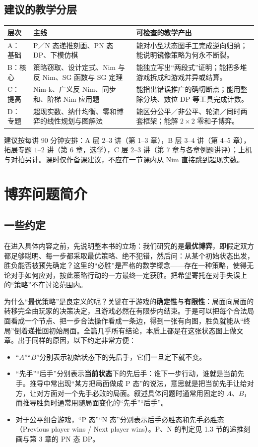 \documentclass[UTF8,a4paper,11pt,oneside,openany,fontset=fandol]{ctexbook}
\theoremstyle{definition}
\begin{document}
\section*{建议的教学分层}
\begin{longtable}{p{}p{}p{}}
\toprule
层次 & 主线 & 可检查的教学产出\\\midrule
A：基础 & P／N 态递推刻画、PN 态 DP、下模仿棋 & 能对小型状态图手工完成逆向归纳；能说明镜像策略为何永不断裂。\\
B：核心 & 策略窃取、设计定式、Nim 与反 Nim、SG 函数与 SG 定理 & 能独立写出“两段式”证明；能把多堆游戏拆成和游戏并异或结算。\\
C：提高 & Nim-k、广义反 Nim、同步和、阶梯 Nim 应用题 & 能指出错误推广的确切断点；能用整除分块、数位 DP 等工具完成计数。\\
D：专题 & 超现实数、纳什均衡、零和博弈的线性规划与图解法 & 能区分公平／非公平、轮流／同时两套框架；能解 $2\times2$ 零和子博弈。\\
\bottomrule
\end{longtable}

建议按每讲 $90$ 分钟安排：A 层 $2$--$3$ 讲（第 1--3 章），B 层 $3$--$4$ 讲（第 4--5 章），拓展专题 $1$--$2$ 讲（第 6 章，选学），C 层 $2$--$3$ 讲（第 7 章与各章例题讲评）；上机与对拍另计。课时仅作备课建议，不应在一节课内从 Nim 直接跳到超现实数。

\tableofcontents
\mainmatter

\chapter{博弈问题简介}
\section{一些约定}
在进入具体内容之前，先说明整本书的立场：我们研究的是\textbf{最优博弈}，即假定双方都足够聪明、每一步都采取最优策略、绝不犯错，然后问：从某个初始状态出发，胜负能否被预先确定？这里的“必胜”是严格的数学概念——存在一种策略，使得无论对手如何应对，按此策略行动的一方最终一定获胜。把希望寄托在对手失误上的“策略”不在讨论范围内。

为什么“最优策略”是良定义的呢？关键在于游戏的\textbf{确定性}与\textbf{有限性}：局面向局面的转移完全由玩家的决策决定，且游戏必然在有限步内结束。于是可以把每个合法局面看成一个节点、把一步合法操作看成一条边，得到一张有向图，胜负就能从“终局”倒着递推回初始局面。全篇几乎所有结论，本质上都是在这张状态图上做文章。出于同样的原因，以下约定非常方便：
\begin{itemize}
\item “$A$”“$B$”分别表示初始状态下的先后手，它们一旦定下就不变。
\item “先手”“后手”分别表示\textbf{当前状态}下的先后手：谁下一步行动，谁就是当前先手。推导中常出现“某方把局面做成 P 态”的说法，意思就是把当前先手让给对方，让对方面对一个先手必败的局面。叙述具体问题时通常用固定的 $A$、$B$，而推导胜负时通常用随局面变化的“先手”“后手”。
\item 对于公平组合游戏，“P 态”“N 态”分别表示后手必胜态和先手必胜态（Previous player wins / Next player wins）。P、N 的判定见 1.3 节的递推刻画与第 3 章的 PN 态 DP。
\end{itemize}
\end{document}
